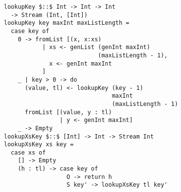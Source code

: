 \begin{figure}[!t]
  \centering
  \begin{minipage}{0.49\textwidth}
    \begin{lstlisting}[label={lookup}, caption={Functional implementations for a \lstinline{lookupo out in out} and \lstinline{lookupo in in out} directions}, captionpos=b, frame=tb]
lookupKey $::$ Int -> Int -> Int
  -> Stream (Int, [Int])
lookupKey key maxInt maxListLength =
  case key of
    0 -> fromList [(x, x:xs)
           | xs <- genList (genInt maxInt)
                           (maxListLength - 1),
             x <- genInt maxInt
           ]
    _ | key > 0 -> do
      (value, tl) <- lookupKey (key - 1)
                               maxInt
                               (maxListLength - 1)
      fromList [(value, y : tl)
                | y <- genInt maxInt]
    _ -> Empty
lookupXsKey $::$ [Int] -> Int -> Stream Int
lookupXsKey xs key =
  case xs of
    [] -> Empty
    (h : tl) -> case key of
                  O -> return h
                  S key' -> lookupXsKey tl key'
    \end{lstlisting}
  \end{minipage}
\end{figure}

